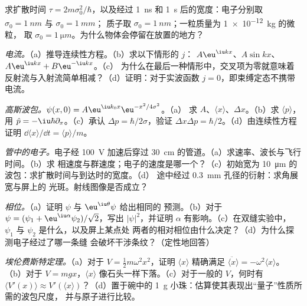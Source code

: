 \begin{exercise}[$\star$]\label{exo:b2:schrodinger-wave-functions:4}
求扩散时间 $\tau = 2m\sigma_0^2/\hbar$，以及经过 \qty{1}{ns} 和
\qty{1}{s} 后的宽度：电子分别取 $\sigma_0 = \qty{1}{nm}$ 与 $\sigma_0 = \qty{1}{mm}$；
质子取 $\sigma_0 = \qty{1}{nm}$；一粒质量为 \qty{1e-12}{kg} 的微粒，
取 $\sigma_0 = \qty{1}{\micro m}$。为什么物体会停留在放置的地方？
\end{exercise}

\begin{exercise}[$\star\star$]\label{exo:b2:schrodinger-wave-functions:5}
\emph{电流。}（a）推导连续性方程。（b）求以下情形的 $j$：
$A\eu^{\iu kx}$、$A\sin kx$、$A\eu^{\iu kx} + B\eu^{-\iu kx}$。（c）
为什么在最后一种情形中，交叉项为零就意味着
反射流与入射流简单相减？（d）证明：对于实波函数
$j = 0$，即束缚定态不携带电流。
\end{exercise}

\begin{exercise}[$\star\star$]\label{exo:b2:schrodinger-wave-functions:6}
\emph{高斯波包。}$\psi(x,0) = A\eu^{\iu k_0x}\eu^{-x^2/4\sigma^2}$。（a）
求 $A$、$\langle x\rangle$、$\Delta x$。（b）求 $\langle p\rangle$，用 $\hat p =
-\iu\hbar\partial_x$。（c）承认 $\Delta p = \hbar/2\sigma$，验证
$\Delta x\Delta p = \hbar/2$。（d）由连续性方程证明 $\dd\langle x\rangle/\dd t = \langle
p\rangle/m$。
\end{exercise}

\begin{exercise}[$\star\star$]\label{exo:b2:schrodinger-wave-functions:7}
\emph{管中的电子。}电子经 \qty{100}{V} 加速后穿过
\qty{30}{cm} 的管道。（a）求速率、波长与飞行时间。（b）求
相速度与群速度；电子的速度是哪一个？（c）初始宽为
\qty{10}{\micro m} 的波包：求扩散时间与到达时的宽度。（d）
途中经过 \qty{0.3}{mm} 孔径的衍射：求角展宽与屏上的
光斑。射线图像是否成立？
\end{exercise}

\begin{exercise}[$\star\star$]\label{exo:b2:schrodinger-wave-functions:8}
\emph{相位。}（a）证明 $\psi$ 与 $\eu^{\iu\theta}\psi$ 给出相同的
预测。（b）对于 $\psi = (\psi_1 + \eu^{\iu\alpha}\psi_2)/\sqrt2$，写出
$|\psi|^2$，并证明 $\alpha$ 有影响。（c）在双缝实验中，
$\psi_1$ 与 $\psi_2$ 是什么，以及屏上某点处
两者的相对相位由什么决定？（d）为什么探测电子经过了哪一条缝
会破坏干涉条纹？（定性地回答）
\end{exercise}

\begin{exercise}[$\star\star$]\label{exo:b2:schrodinger-wave-functions:9}
\emph{埃伦费斯特定理。}（a）对于 $V = \tfrac12m\omega^2x^2$，证明 $\langle
x\rangle$ 精确满足 $\ddot{\langle x\rangle} = -\omega^2\langle x\rangle$。
（b）对于 $V = mgx$，$\langle x\rangle$ 像石头一样下落。（c）对于一般的
$V$，何时有 $\langle V'(x)\rangle \approx V'(\langle x\rangle)$？（d）置于碗中的
\qty{1}{g} 小珠：估算使其表现出“量子”性质所需的波包尺度，
并与原子进行比较。
\end{exercise}

